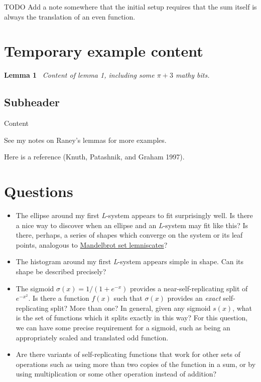 \documentclass[]{article}
\providecommand{\tightlist}{%
  \setlength{\itemsep}{0pt}\setlength{\parskip}{0pt}}
\begin{document}
TODO Add a note somewhere that the initial setup requires that the sum
itself is always the translation of an even function.

\section{Temporary example content}\label{temporary-example-content}

\textbf{Lemma 1}~ \emph{Content of lemma 1, including some \(\pi+3\)
mathy bits.}

\subsection{Subheader}\label{subheader}

Content

See my notes on Raney's lemmas for more examples.

Here is a reference (Knuth, Patashnik, and Graham 1997).

\section{Questions}\label{questions}

\begin{itemize}
\tightlist
\item
  The ellipse around my first \emph{L}-system appears to fit
  surprisingly well. Is there a nice way to discover when an ellipse and
  an \emph{L}-system may fit like this? Is there, perhaps, a series of
  shapes which converge on the system or its leaf points, analogous to
  \href{http://mathworld.wolfram.com/MandelbrotSetLemniscate.html}{Mandelbrot
  set lemniscates}?
\item
  The histogram around my first \emph{L}-system appears simple in shape.
  Can its shape be described precisely?
\item
  The sigmoid \(\sigma(x)=1/(1+e^{-x})\) provides a
  near-self-replicating split of \(e^{-x^2}\). Is there a function
  \(f(x)\) such that \(\sigma(x)\) provides an \emph{exact}
  self-replicating split? More than one? In general, given any sigmoid
  \(s(x)\), what is the set of functions which it splits exactly in this
  way? For this question, we can have some precise requirement for a
  sigmoid, such as being an appropriately scaled and translated odd
  function.
\item
  Are there variants of self-replicating functions that work for other
  sets of operations such as using more than two copies of the function
  in a sum, or by using multiplication or some other operation instead
  of addition?
\end{itemize}
\end{document}
